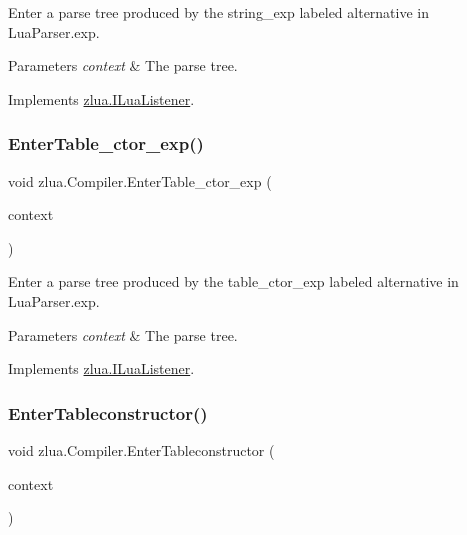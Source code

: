Enter a parse tree produced by the {\ttfamily string\+\_\+exp} labeled alternative in Lua\+Parser.\+exp. 


\begin{DoxyParams}{Parameters}
{\em context} & The parse tree.\\
\hline
\end{DoxyParams}


Implements \mbox{\hyperlink{interfacezlua_1_1_i_lua_listener_a8e9361d3a88bf9fe02b6be1b7aa3f066}{zlua.\+I\+Lua\+Listener}}.

\mbox{\label{classzlua_1_1_compiler_afbc0c7f12e4f12a6c032ce90cf17b2ef}} 
\subsubsection{\texorpdfstring{Enter\+Table\+\_\+ctor\+\_\+exp()}{EnterTable\_ctor\_exp()}}
{\footnotesize\ttfamily void zlua.\+Compiler.\+Enter\+Table\+\_\+ctor\+\_\+exp (\begin{DoxyParamCaption}\item[{\mbox{[}\+Not\+Null\mbox{]} \mbox{\hyperlink{classzlua_1_1_lua_parser_1_1_table__ctor__exp_context}{Lua\+Parser.\+Table\+\_\+ctor\+\_\+exp\+Context}}}]{context }\end{DoxyParamCaption})}



Enter a parse tree produced by the {\ttfamily table\+\_\+ctor\+\_\+exp} labeled alternative in Lua\+Parser.\+exp. 


\begin{DoxyParams}{Parameters}
{\em context} & The parse tree.\\
\hline
\end{DoxyParams}


Implements \mbox{\hyperlink{interfacezlua_1_1_i_lua_listener_a8f36bb02f3d3923600ba29606adf1db4}{zlua.\+I\+Lua\+Listener}}.

\mbox{\label{classzlua_1_1_compiler_af18957aed84481c7763b249286bd28b2}} 
\subsubsection{\texorpdfstring{Enter\+Tableconstructor()}{EnterTableconstructor()}}
{\footnotesize\ttfamily void zlua.\+Compiler.\+Enter\+Tableconstructor (\begin{DoxyParamCaption}\item[{\mbox{[}\+Not\+Null\mbox{]} \mbox{\hyperlink{classzlua_1_1_lua_parser_1_1_tableconstructor_context}{Lua\+Parser.\+Tableconstructor\+Context}}}]{context }\end{DoxyParamCaption})}



